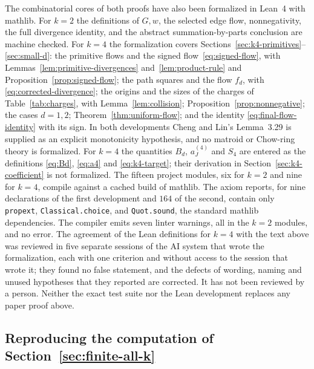 \documentclass[11pt]{amsart}
\theoremstyle{definition}
\theoremstyle{remark}
\begin{document}
The combinatorial cores of both proofs have also been formalized in Lean~4
with mathlib.  For $k=2$ the definitions of $G,w$, the selected edge flow,
nonnegativity, the full divergence identity, and the abstract
summation-by-parts conclusion are machine checked.  For $k=4$ the
formalization covers
Sections~\ref{sec:k4-primitives}--\ref{sec:small-d}: the primitive flows and
the signed flow~\eqref{eq:signed-flow}, with
Lemmas~\ref{lem:primitive-divergences} and~\ref{lem:product-rule} and
Proposition~\ref{prop:signed-flow}; the path squares and the flow $f_d$, with
\eqref{eq:corrected-divergence}; the origins and the sizes of the charges of
Table~\ref{tab:charges}, with Lemma~\ref{lem:collision};
Proposition~\ref{prop:nonnegative}; the cases $d=1,2$;
Theorem~\ref{thm:uniform-flow}; and the identity
\eqref{eq:final-flow-identity} with its sign.  In both developments Cheng and
Lin's Lemma~3.29 is supplied as an explicit monotonicity hypothesis, and no
matroid or Chow-ring theory is formalized.  For $k=4$ the quantities $B_d$,
$a^{(4)}_J$ and $S_4$ are entered as the definitions \eqref{eq:Bd},
\eqref{eq:a4} and \eqref{eq:k4-target}; their derivation in
Section~\ref{sec:k4-coefficient} is not formalized.  The fifteen project
modules, six for $k=2$ and nine for $k=4$, compile against a cached build of
mathlib.  The axiom reports, for nine declarations of the first development
and $164$ of the second, contain only \texttt{propext},
\texttt{Classical.choice}, and \texttt{Quot.sound}, the standard mathlib
dependencies.  The compiler emits seven linter warnings, all in the $k=2$
modules, and no error.  The agreement of the Lean definitions for $k=4$ with
the text above was reviewed in five separate sessions of the AI system that
wrote the formalization, each with one criterion and without access to the
session that wrote it; they found no false statement, and the defects of
wording, naming and unused hypotheses that they reported are corrected.  It
has not been reviewed by a person.  Neither the exact test suite nor the Lean
development replaces any paper proof above.

\subsection*{Reproducing the computation of Section~\ref{sec:finite-all-k}}
\end{document}
